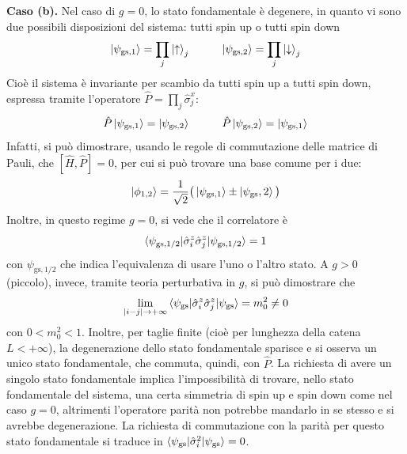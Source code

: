 \documentclass[11pt, a4paper]{scrartcl}
\theoremstyle{style}
\theoremstyle{style1}
\numberwithin{equation}{subsection}
\begin{document}
\textbf{Caso (b).} Nel caso di $g=0$, lo stato fondamentale \`e degenere, in quanto vi sono due possibili disposizioni del sistema: tutti spin up o tutti spin down
\[
\ket{\psi _{\text{gs},1} }  = \prod_j \ket{\uparrow} _j \hspace{1cm} \ket{\psi _{\text{gs}, 2} }  =\prod_j \ket{\downarrow} _j
\] 
Cio\`e il sistema \`e invariante per scambio da tutti spin up a tutti spin down, espressa tramite l'operatore $\hat{P}=\prod_j \hat{\sigma }_j^x$:
\[
\hat{P}\ket{\psi _{\text{gs},1} } = \ket{\psi _{\text{gs},2} }  \hspace{1cm} \hat{P} \ket{\psi _{\text{gs},2} } = \ket{\psi _{\text{gs},1} } 
\] 
Infatti, si pu\`o dimostrare, usando le regole di commutazione delle matrice di Pauli, che $[\hat{H}, \hat{P}] = 0$, per cui si pu\`o trovare una base comune per i due:
\[
\ket{\phi _{1,2} } = \frac{1}{\sqrt{2} } \big(\ket{\psi _{\text{gs},1} } \pm \ket{\psi _{\text{gs}} ,2}  \big)
\] 
Inoltre, in questo regime $g=0$, si vede che il correlatore \`e
\[
\braket{\psi _{\text{gs},1 / 2} |\hat{\sigma }_i^z \hat{\sigma }^z_j|\psi _{\text{gs},1 / 2} }  = 1
\] 
con $\psi _{\text{gs},1 / 2}$ che indica l'equivalenza di usare l'uno o l'altro stato.
A $g>0$ (piccolo), invece, tramite teoria perturbativa in $g$, si pu\`o dimostrare che 
\[
\lim_{\lvert i-j \rvert  \to +\infty} \braket{\psi _\text{gs}|\hat{\sigma }^z_i \hat{\sigma }^z_j|\psi _\text{gs}} = m_0^2 \neq 0
\] 
con $0<m_0^2< 1$.
Inoltre, per taglie finite (cio\`e per lunghezza della catena $L<+\infty$), la degenerazione dello stato fondamentale sparisce e si osserva un unico stato fondamentale, che commuta, quindi, con $\hat{P}$.
La richiesta di avere un singolo stato fondamentale implica l'impossibilit\`a di trovare, nello stato fondamentale del sistema, una certa simmetria di spin up e spin down come nel caso $g=0$, altrimenti l'operatore parit\`a non potrebbe mandarlo in se stesso e si avrebbe degenerazione.
La richiesta di commutazione con la parit\`a per questo stato fondamentale si traduce in $\braket{\psi _\text{gs}|\hat{\sigma }_i^2|\psi _\text{gs}} =0$.
\end{document}
